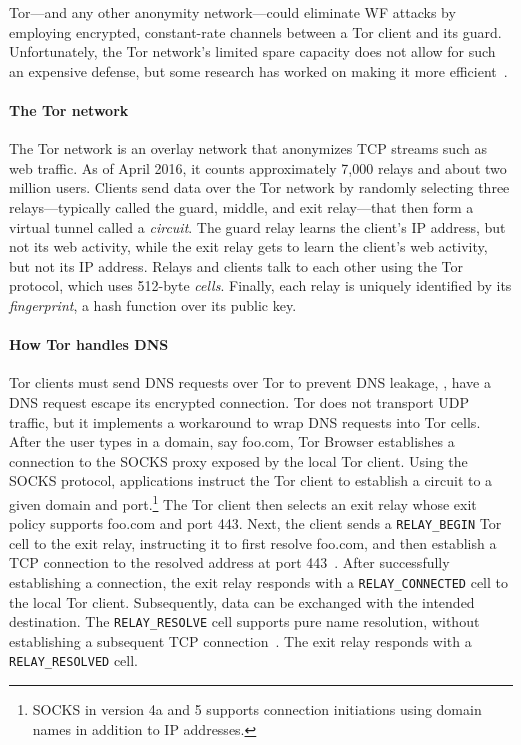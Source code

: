 Tor---and any other anonymity network---could eliminate WF
attacks by employing encrypted, constant-rate channels between a Tor client and
its guard.  Unfortunately, the Tor network's limited spare capacity does not
allow for such an expensive defense, but some research has worked on making it
more efficient~\cite{Cai2014a,DBLP:journals/corr/JuarezIPDW15,WangThesis}.

\paragraph{The Tor network}
The Tor network is an overlay network that anonymizes TCP streams such as web
traffic.  As of April 2016, it counts approximately 7,000 relays and about two
million users.  Clients send data over the Tor network by randomly selecting
three relays---typically called the guard, middle, and exit relay---that then
form a virtual tunnel called a \emph{circuit}.  The guard relay learns the
client's IP address, but not its web activity, while the exit relay gets to
learn the client's web activity, but not its IP address.  Relays and clients
talk to each other using the Tor protocol, which uses 512-byte \emph{cells}.
Finally, each relay is uniquely identified by its \emph{fingerprint}, a hash
function over its public key.

\paragraph{How Tor handles DNS}
Tor clients must send DNS requests over Tor to prevent DNS leakage, \ie, have a
DNS request escape its encrypted connection.  Tor does not transport UDP
traffic, but it implements a workaround to wrap DNS requests into Tor cells.
After the user types in a domain, say foo.com, Tor Browser establishes a
connection to the SOCKS proxy exposed by the local Tor client.  Using the SOCKS
protocol, applications instruct the Tor client to establish a circuit to a given
domain and port.\footnote{SOCKS in version 4a and 5 supports connection
initiations using domain names in addition to IP addresses.} The Tor client then
selects an exit relay whose exit policy supports foo.com and port 443.  Next,
the client sends a \texttt{RELAY\_BEGIN} Tor cell to the exit relay, instructing
it to first resolve foo.com, and then establish a TCP connection to the resolved
address at port 443~\cite[\S~6.2]{tor-spec}.  After successfully establishing a
connection, the exit relay responds with a \texttt{RELAY\_CONNECTED} cell to the
local Tor client.  Subsequently, data can be exchanged with the intended
destination.  The \texttt{RELAY\_RESOLVE} cell supports pure name resolution,
without establishing a subsequent TCP connection~\cite[\S~6.4]{tor-spec}.  The
exit relay responds with a \texttt{RELAY\_RESOLVED} cell.

